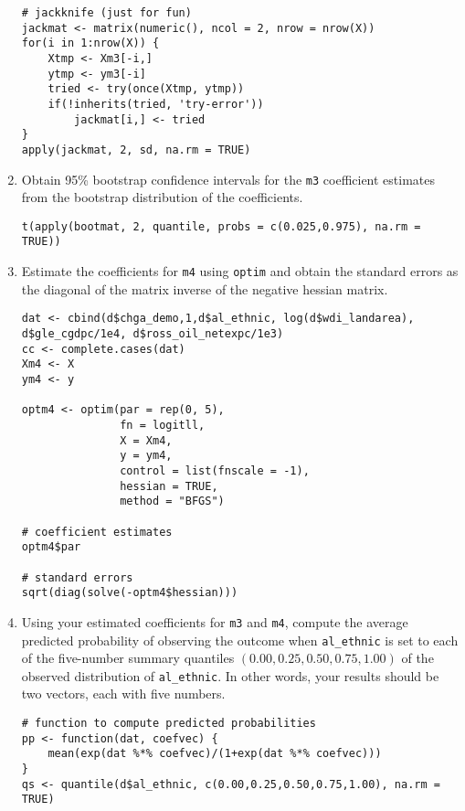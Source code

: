 \documentclass[a4paper,12pt]{article}
\begin{document}
\begin{enumerate}
\begin{solution}
\begin{lstlisting}
# jackknife (just for fun)
jackmat <- matrix(numeric(), ncol = 2, nrow = nrow(X))
for(i in 1:nrow(X)) {
    Xtmp <- Xm3[-i,]
    ytmp <- ym3[-i]
    tried <- try(once(Xtmp, ytmp))
    if(!inherits(tried, 'try-error'))
        jackmat[i,] <- tried
}
apply(jackmat, 2, sd, na.rm = TRUE)
\end{lstlisting}
\end{solution}

\item Obtain 95\% bootstrap confidence intervals for the \texttt{m3} coefficient estimates from the bootstrap distribution of the coefficients.

\begin{solution}
\begin{lstlisting}
t(apply(bootmat, 2, quantile, probs = c(0.025,0.975), na.rm = TRUE))
\end{lstlisting}
\end{solution}

\item Estimate the coefficients for \texttt{m4} using \texttt{optim} and obtain the standard errors as the diagonal of the matrix inverse of the negative hessian matrix.

\begin{solution}
\begin{lstlisting}
dat <- cbind(d$chga_demo,1,d$al_ethnic, log(d$wdi_landarea), d$gle_cgdpc/1e4, d$ross_oil_netexpc/1e3)
cc <- complete.cases(dat)
Xm4 <- X
ym4 <- y

optm4 <- optim(par = rep(0, 5),
               fn = logitll,
               X = Xm4,
               y = ym4,
               control = list(fnscale = -1),
               hessian = TRUE,
               method = "BFGS")

# coefficient estimates
optm4$par

# standard errors
sqrt(diag(solve(-optm4$hessian)))
\end{lstlisting}
\end{solution}


\item Using your estimated coefficients for \texttt{m3} and \texttt{m4}, compute the average predicted probability of observing the outcome when \texttt{al\_ethnic} is set to each of the five-number summary quantiles $(0.00, 0.25, 0.50, 0.75, 1.00)$ of the observed distribution of \texttt{al\_ethnic}. In other words, your results should be two vectors, each with five numbers.

\begin{solution}
\begin{lstlisting}
# function to compute predicted probabilities
pp <- function(dat, coefvec) {
    mean(exp(dat %*% coefvec)/(1+exp(dat %*% coefvec)))
}
qs <- quantile(d$al_ethnic, c(0.00,0.25,0.50,0.75,1.00), na.rm = TRUE)


\end{lstlisting}
\end{solution}
\end{enumerate}
\end{document}
